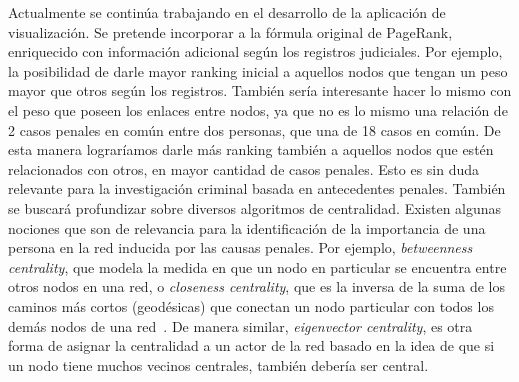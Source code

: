 Actualmente se 	continúa trabajando en el desarrollo de la aplicación de visualización. Se pretende incorporar a la fórmula original de PageRank, enriquecido con información adicional según los registros judiciales. Por ejemplo, la posibilidad de darle mayor ranking inicial a aquellos nodos que tengan un peso mayor que otros según los registros. También sería interesante hacer lo mismo con el peso que poseen los enlaces entre nodos, ya que no es lo mismo una relación de 2 casos penales en común entre dos personas, que una de 18 casos en común. De esta manera lograríamos darle más ranking también a aquellos nodos que estén relacionados con otros, en mayor cantidad de casos penales. Esto es sin duda relevante para la investigación criminal basada en antecedentes penales.
También se buscará profundizar sobre diversos algoritmos de centralidad. Existen algunas nociones que son de relevancia para la identificación de la importancia de una persona en la red inducida por las causas penales. Por ejemplo, \textit{betweenness centrality}, que modela la medida en que un nodo en particular se encuentra entre otros nodos en una red, o \textit{closeness centrality}, que es la inversa de la suma de los caminos más cortos (geodésicas) que conectan un nodo particular con todos los demás nodos de una red~\cite{newman2005measure}. De manera similar, \textit{eigenvector centrality}, es otra forma de asignar la centralidad a un actor de la red basado en la idea de que si un nodo tiene muchos vecinos centrales, también debería ser central.
 